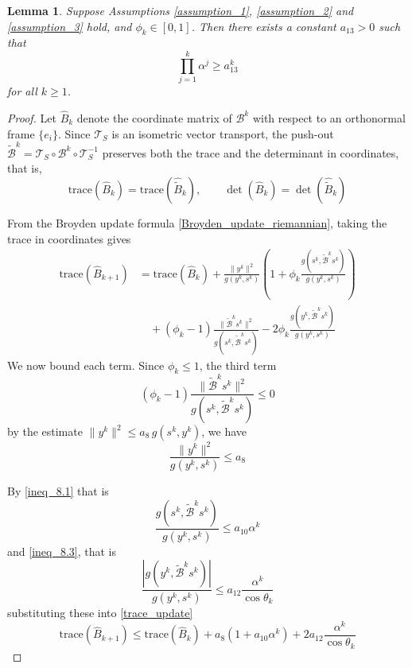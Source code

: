 \documentclass[12pt,a4paper,draft]{article}  %
\newtheorem{lemma}{Lemma}[section]
\theoremstyle{definition}
\numberwithin{equation}{section}
\newcommand{\VT}{\mathcal{T}}
\begin{document}
\begin{lemma}\label{lemma_9}
        Suppose Assumptions \ref{assumption_1}, \ref{assumption_2} and \ref{assumption_3} hold, and $\phi_k\in [0,1]$. Then there exists a constant $a_{13}>0$ such that
        \begin{equation}\label{product_alpha_lower_bound}
                \prod_{j=1}^k \alpha^j \geq a_{13}^k
        \end{equation}
        for all $k\geq 1$.
\end{lemma}
\begin{proof}
        Let $\hat{B}_k$ denote the coordinate matrix of $\mathcal{B}^k$ with respect to an orthonormal frame $\{e_i\}$. Since $\VT_S$ is an isometric vector transport, the push-out $\tilde{\mathcal{B}}^k = \VT_S\circ \mathcal{B}^k\circ \VT_S^{-1}$ preserves both the trace and the determinant in coordinates, that is,
        \begin{equation}\label{trace_det_invariance}
                \mathrm{trace}(\hat{B}_k) = \mathrm{trace}(\hat{\tilde{B}}_k), \qquad \det(\hat{B}_k) = \det(\hat{\tilde{B}}_k)
        \end{equation}

        From the Broyden update formula \eqref{Broyden_update_riemannian}, taking the trace in coordinates gives
        \begin{equation}\label{trace_update}
        \begin{aligned}
                \mathrm{trace}(\hat{B}_{k+1}) &= \mathrm{trace}(\hat{B}_k) + \frac{\|y^k\|^2}{g(y^k,s^k)}\left(1 + \phi_k\frac{g(s^k, \tilde{\mathcal{B}}^ks^k)}{g(y^k,s^k)}\right)\\
                &\quad + (\phi_k - 1)\frac{\|\tilde{\mathcal{B}}^ks^k\|^2}{g(s^k, \tilde{\mathcal{B}}^ks^k)} - 2\phi_k\frac{g(y^k,\tilde{\mathcal{B}}^ks^k)}{g(y^k,s^k)}
        \end{aligned}
        \end{equation}
        We now bound each term. Since $\phi_k\leq 1$, the third term $$(\phi_k - 1)\frac{\|\tilde{\mathcal{B}}^ks^k\|^2}{g(s^k,\tilde{\mathcal{B}}^ks^k)}\leq 0$$ by the estimate $\|y^k\|^2\leq a_8\,g(s^k,y^k)$, we have $$\frac{\|y^k\|^2}{g(y^k,s^k)}\leq a_8$$
        
        By \eqref{ineq_8.1} that is $$\frac{g(s^k,\tilde{\mathcal{B}}^ks^k)}{g(y^k,s^k)}\leq a_{10}\alpha^k$$ and \eqref{ineq_8.3}, that is $$\frac{|g(y^k,\tilde{\mathcal{B}}^ks^k)|}{g(y^k,s^k)}\leq a_{12}\frac{\alpha^k}{\cos\theta_k}$$
        substituting these into \eqref{trace_update}
        \begin{equation}\label{trace_bound_intermediate}
                \mathrm{trace}(\hat{B}_{k+1}) \leq \mathrm{trace}(\hat{B}_k) + a_8(1 + a_{10}\alpha^k) + 2a_{12}\frac{\alpha^k}{\cos\theta_k}
        \end{equation}


\end{proof}
\end{document}
